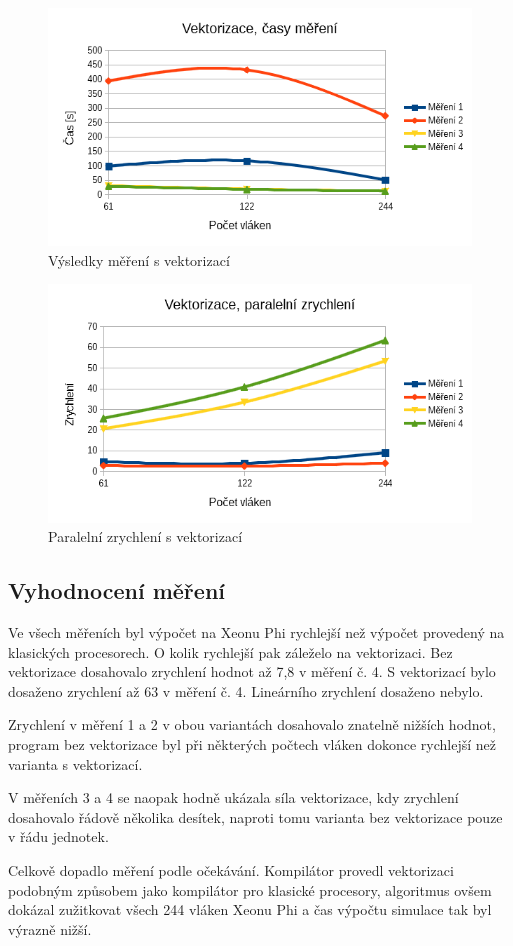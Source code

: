 \documentclass[12pt]{article}
\begin{document}
%
%
\begin{figure}[H]
  \begin{center}
      \includegraphics[width=12cm]{images/sdruzene/phi/vectime.png}	
    \caption{Výsledky měření s vektorizací}
  \end{center}
\end{figure}
%
%
\begin{figure}[H]
  \begin{center}
      \includegraphics[width=12cm]{images/sdruzene/phi/vecacc.png}	
    \caption{Paralelní zrychlení s vektorizací}
  \end{center}
\end{figure}

\subsection{Vyhodnocení měření}
Ve všech měřeních byl výpočet na Xeonu Phi rychlejší než výpočet provedený na klasických procesorech.
O kolik rychlejší pak záleželo na vektorizaci.
Bez vektorizace dosahovalo zrychlení hodnot až 7,8 v měření č. 4.
S vektorizací bylo dosaženo zrychlení až 63 v měření č. 4.
Lineárního zrychlení dosaženo nebylo.

Zrychlení v měření 1 a 2 v obou variantách dosahovalo znatelně nižších hodnot,
program bez vektorizace byl při některých počtech vláken dokonce rychlejší než varianta s vektorizací.

V měřeních 3 a 4 se naopak hodně ukázala síla vektorizace, kdy zrychlení dosahovalo řádově několika desítek, naproti tomu varianta bez vektorizace pouze v řádu jednotek.

Celkově dopadlo měření podle očekávání.
Kompilátor provedl vektorizaci podobným způsobem jako kompilátor pro klasické procesory, algoritmus ovšem dokázal zužitkovat všech 244 vláken Xeonu Phi a čas výpočtu simulace tak byl výrazně nižší.
\end{document}
